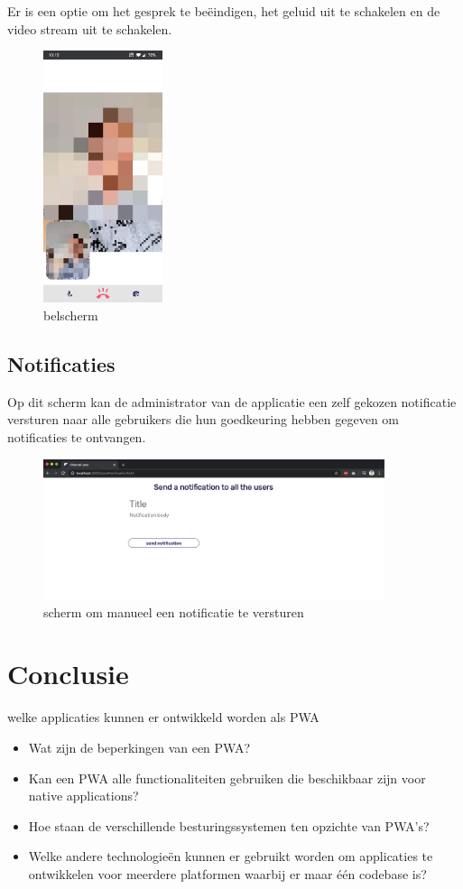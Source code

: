 		Er is een optie om het gesprek te beëindigen, het geluid uit te schakelen en de video stream uit te schakelen.
		\begin{figure}[H]
			\centering
			\includegraphics[width=35mm]{./img/POC/call.jpg}{}		
			\caption{belscherm}
		\end{figure}
		
	\subsection{Notificaties}
		Op dit scherm kan de administrator van de applicatie een zelf gekozen notificatie versturen naar alle gebruikers die hun goedkeuring hebben gegeven om notificaties te ontvangen.
		
		\begin{figure}[H]
			\centering
			\includegraphics[width=100mm]{./img/POC/sendNoti}{}		
			\caption{scherm om manueel een notificatie te versturen}
		\end{figure}
		

\section{Conclusie}



welke applicaties kunnen er ontwikkeld worden als PWA
	\begin{itemize}
		  \item Wat zijn de beperkingen van een PWA?
		  \item Kan een PWA alle functionaliteiten gebruiken die beschikbaar zijn voor native applications?
		  \item Hoe staan de verschillende besturingssystemen ten opzichte van PWA's?
		  \item Welke andere technologieën kunnen er gebruikt worden om applicaties te ontwikkelen voor meerdere platformen waarbij er maar één codebase is?
	  \end{itemize}	

